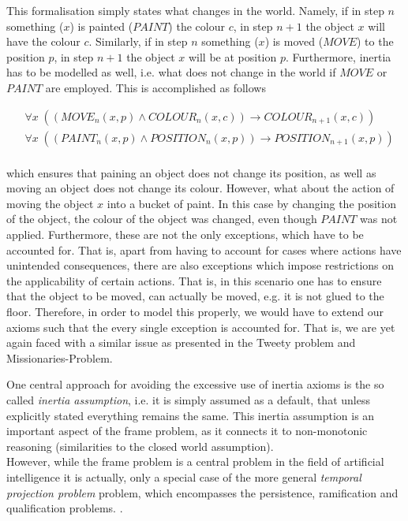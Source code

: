 \documentclass{article}
\begin{document}
This formalisation simply states what changes in the world. Namely, if in step $n$ something ($x$) is painted ($PAINT$) the colour $c$, in step $n+1$ the object $x$ will have the colour $c$. Similarly, if in step $n$ something ($x$) is moved ($MOVE$) to the position $p$, in step $n+1$ the object $x$ will be at position $p$. Furthermore, inertia has to be modelled as well, i.e. what does not change in the world if $MOVE$ or $PAINT$ are employed. This is accomplished as follows

\begin{equation*}
\begin{split}
&\forall x \; ((MOVE_{n}(x,p) \wedge COLOUR_{n}(x,c)) \to COLOUR_{n+1}(x,c)) \\
&\forall x \; ((PAINT_{n}(x,p) \wedge POSITION_{n}(x,p)) \to POSITION_{n+1}(x,p)) \\
\end{split}
\end{equation*}

which ensures that paining an object does not change its position, as well as moving an object does not change its colour. However, what about the action of moving the object $x$ into a bucket of paint. In this case by changing the position of the object, the colour of the object was changed, even though $PAINT$ was not applied. 
Furthermore, these are not the only exceptions, which have to be accounted for. That is, apart from having to account for cases where actions have unintended consequences, there are also exceptions which impose restrictions on the applicability of certain actions. That is, in this scenario one has to ensure that the object to be moved, can actually be moved, e.g. it is not glued to the floor.     
Therefore, in order to model this properly, we would have to extend our axioms such that the every single exception is accounted for. That is, we are yet again faced with a similar issue as presented in the Tweety problem and Missionaries-Problem.
\cite{stanford2016frame,lifschitz2015dramatic} \\
\linebreak

One central approach for avoiding the excessive use of inertia axioms is the so called \emph{inertia assumption}, i.e. it is simply assumed as a default, that unless explicitly stated everything remains the same. This inertia assumption is an important aspect of the frame problem, as it connects it to non-monotonic reasoning (similarities to the closed world assumption). \cite{BOCHMAN2007557} \\
However, while the frame problem is a central problem in the field of artificial intelligence it is actually, only a special case of the more general \emph{temporal projection problem} problem, which encompasses the persistence, ramification and qualification problems. \cite{BOCHMAN2007557}.
\end{document}
